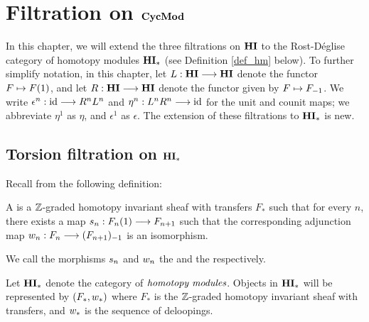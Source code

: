 \newpage
\chapter{Filtration on $\mathbf{CycMod}$}\label{sect_filtration_cycmod}

In this chapter, we will extend the three filtrations on
$\mathbf{HI}$ to the Rost-D\'eglise category of homotopy modules $\mathbf{HI}_*$ 
(see Definition \ref{def_hm} below). To further simplify notation, 
in this chapter, let $L: \mathbf{HI} \longrightarrow \mathbf{HI}$ denote the functor $F 
\mapsto F(1)$, and let $R: \mathbf{HI} \longrightarrow \mathbf{HI}$ denote the functor 
given by $F \mapsto F_{-1}$. We write $\epsilon^n : \mathrm{id} \longrightarrow 
R^nL^n$ and $\eta^n: L^nR^n \longrightarrow \mathrm{id}$ for the unit and counit maps; 
we abbreviate $\eta^1$ as $\eta$, and $\epsilon^1$ as $\epsilon$.
The extension of these filtrations to $\mathbf{HI}_*$ is new.

\section{Torsion filtration on $\mathbf{HI}_*$}


Recall from \cite[1.17]{DegModHom} the following definition:

\begin{defn}\label{def_hm}
A  is a $\mathbb{Z}$-graded homotopy 
invariant sheaf with transfers $F_*$ such that for every $n$, 
there exists a map $s_n: F_n(1) \longrightarrow F_{n+1}$ such that the 
corresponding adjunction map $w_n: F_n \longrightarrow (F_{n+1})_{-1}$
is an isomorphism.

We call the morphisms $s_n$ and $w_n$ the  and the  respectively.

Let $\mathbf{HI}_*$ denote the category of $\emph{homotopy modules}$.
Objects in $\mathbf{HI}_*$ will be represented by $(F_*, w_*)$ where 
$F_*$ is the $\mathbb{Z}$-graded homotopy invariant sheaf with transfers, 
and $w_*$ is the sequence of deloopings.
\end{defn}

